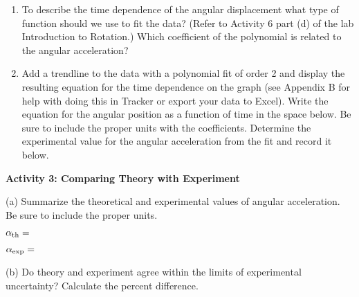 \begin{enumerate}
\item To describe the time dependence of the angular displacement what type of 
function should we use to fit the data? (Refer to Activity 6 part (d) of the lab Introduction to Rotation.) Which coefficient of the polynomial is related to 
the angular acceleration?
\answerspace{20mm}


\item Add a trendline to the data with a polynomial fit of order 2 and display the resulting equation for the time dependence on the graph (see Appendix B for help with doing this in Tracker or export your data to Excel). Write the equation for the angular position as a function of time in the space below. Be sure to include the proper units with the coefficients. Determine the experimental value for the angular acceleration from the fit and record it below. 
\vspace{20mm}

\end{enumerate}


\textbf{Activity 3: Comparing Theory with Experiment }

(a) Summarize the theoretical and experimental values of angular acceleration. 
Be sure to include the proper units.
\vspace{10mm}

\( \alpha _{\rm th}= \)
\vspace{10mm}

\( \alpha _{\rm exp}= \) 
\vspace{15mm}

(b) Do theory and experiment agree within the limits of experimental 
uncertainty? Calculate the percent difference.

